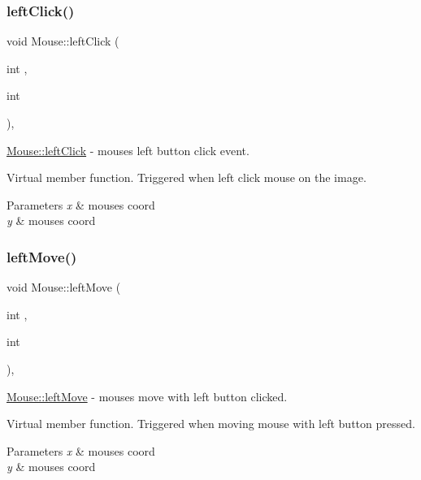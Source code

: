 \subsubsection{\texorpdfstring{leftClick()}{leftClick()}}
{\footnotesize\ttfamily void Mouse\+::left\+Click (\begin{DoxyParamCaption}\item[{int}]{,  }\item[{int}]{ }\end{DoxyParamCaption})\hspace{0.3cm}{\ttfamily [protected]}, {\ttfamily [virtual]}}



\mbox{\hyperlink{class_mouse_a186e5b7ddfbb4681326286509a064d28}{Mouse\+::left\+Click}} -\/ mouse\textquotesingle{}s left button click event. 

Virtual member function. Triggered when left click mouse on the image. 
\begin{DoxyParams}{Parameters}
{\em x} & mouse\textquotesingle{}s coord \\
\hline
{\em y} & mouse\textquotesingle{}s coord \\
\hline
\end{DoxyParams}
\mbox{\label{class_mouse_a809fe39af5186e39a5768fb6bb06da56}} 
\subsubsection{\texorpdfstring{leftMove()}{leftMove()}}
{\footnotesize\ttfamily void Mouse\+::left\+Move (\begin{DoxyParamCaption}\item[{int}]{,  }\item[{int}]{ }\end{DoxyParamCaption})\hspace{0.3cm}{\ttfamily [protected]}, {\ttfamily [virtual]}}



\mbox{\hyperlink{class_mouse_a809fe39af5186e39a5768fb6bb06da56}{Mouse\+::left\+Move}} -\/ mouse\textquotesingle{}s move with left button clicked. 

Virtual member function. Triggered when moving mouse with left button pressed. 
\begin{DoxyParams}{Parameters}
{\em x} & mouse\textquotesingle{}s coord \\
\hline
{\em y} & mouse\textquotesingle{}s coord \\
\hline
\end{DoxyParams}
\mbox{\label{class_mouse_a837d20f61ecb374f5b9c789cc141983e}} 
